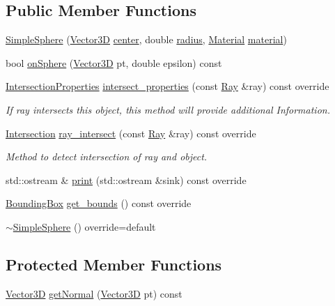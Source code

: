 \subsection*{Public Member Functions}
\begin{DoxyCompactItemize}
\item 
\hyperlink{classSimpleSphere_ae893a4b886a92fe81e1b46766faaf6cd}{Simple\+Sphere} (\hyperlink{classVector3D}{Vector3D} \hyperlink{classSimpleSphere_af432089b8146295c77f52f22835bf1ab}{center}, double \hyperlink{classSimpleSphere_ad69dbac136ee99110f41b7b84656b144}{radius}, \hyperlink{classMaterial}{Material} \hyperlink{classSimpleSphere_abfb049ac4dabb0c7fbb78d7791e33e42}{material})
\item 
bool \hyperlink{classSimpleSphere_aa86dd85d74a4fda533a7dda26ff2ed85}{on\+Sphere} (\hyperlink{classVector3D}{Vector3D} pt, double epsilon) const 
\item 
\hyperlink{classIntersectionProperties}{Intersection\+Properties} \hyperlink{classSimpleSphere_a4c71f3e8197f40c18cee7508f2fd3e9c}{intersect\+\_\+properties} (const \hyperlink{classRay}{Ray} \&ray) const override
\begin{DoxyCompactList}\small\item\em If ray intersects this object, this method will provide additional Information. \end{DoxyCompactList}\item 
\hyperlink{classIntersection}{Intersection} \hyperlink{classSimpleSphere_abb50f169da7cb2acab05c8f9d56cd1e8}{ray\+\_\+intersect} (const \hyperlink{classRay}{Ray} \&ray) const override
\begin{DoxyCompactList}\small\item\em Method to detect intersection of ray and object. \end{DoxyCompactList}\item 
std\+::ostream \& \hyperlink{classSimpleSphere_a2da3c9e41a8d8e6ec4012343ea0fa793}{print} (std\+::ostream \&sink) const override
\item 
\hyperlink{classBoundingBox}{Bounding\+Box} \hyperlink{classSimpleSphere_aa5b6b2ebbe3de4490cdaa0f5c08b961c}{get\+\_\+bounds} () const override
\item 
\hyperlink{classSimpleSphere_a7ffaeb08624ecd5c91ed88c10f2fbff7}{$\sim$\+Simple\+Sphere} () override=default
\end{DoxyCompactItemize}
\subsection*{Protected Member Functions}
\begin{DoxyCompactItemize}
\item 
\hyperlink{classVector3D}{Vector3D} \hyperlink{classSimpleSphere_a3661d89a607462f612c1e751b76e4556}{get\+Normal} (\hyperlink{classVector3D}{Vector3D} pt) const 
\end{DoxyCompactItemize}
